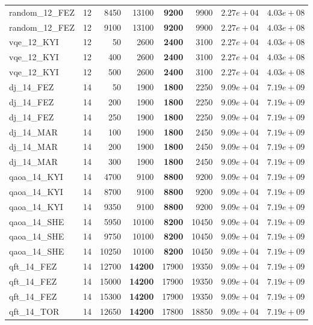 \begin{table}[ht!]
\begin{tabular}{l c r r r r r r}
random\_12\_FEZ & 12 & 8450 & 13100 & \textbf{9200} & 9900 & $2.27e+04$ & $4.03e+08$ \\
random\_12\_FEZ & 12 & 9100 & 13100 & \textbf{9200} & 9900 & $2.27e+04$ & $4.03e+08$ \\
vqe\_12\_KYI & 12 & 50 & 2600 & \textbf{2400} & 3100 & $2.27e+04$ & $4.03e+08$ \\
vqe\_12\_KYI & 12 & 400 & 2600 & \textbf{2400} & 3100 & $2.27e+04$ & $4.03e+08$ \\
vqe\_12\_KYI & 12 & 500 & 2600 & \textbf{2400} & 3100 & $2.27e+04$ & $4.03e+08$ \\
dj\_14\_FEZ & 14 & 50 & 1900 & \textbf{1800} & 2250 & $9.09e+04$ & $7.19e+09$ \\
dj\_14\_FEZ & 14 & 200 & 1900 & \textbf{1800} & 2250 & $9.09e+04$ & $7.19e+09$ \\
dj\_14\_FEZ & 14 & 250 & 1900 & \textbf{1800} & 2250 & $9.09e+04$ & $7.19e+09$ \\
dj\_14\_MAR & 14 & 100 & 1900 & \textbf{1800} & 2450 & $9.09e+04$ & $7.19e+09$ \\
dj\_14\_MAR & 14 & 200 & 1900 & \textbf{1800} & 2450 & $9.09e+04$ & $7.19e+09$ \\
dj\_14\_MAR & 14 & 300 & 1900 & \textbf{1800} & 2450 & $9.09e+04$ & $7.19e+09$ \\
qaoa\_14\_KYI & 14 & 4700 & 9100 & \textbf{8800} & 9200 & $9.09e+04$ & $7.19e+09$ \\
qaoa\_14\_KYI & 14 & 8700 & 9100 & \textbf{8800} & 9200 & $9.09e+04$ & $7.19e+09$ \\
qaoa\_14\_KYI & 14 & 9350 & 9100 & \textbf{8800} & 9200 & $9.09e+04$ & $7.19e+09$ \\
qaoa\_14\_SHE & 14 & 5950 & 10100 & \textbf{8200} & 10450 & $9.09e+04$ & $7.19e+09$ \\
qaoa\_14\_SHE & 14 & 9750 & 10100 & \textbf{8200} & 10450 & $9.09e+04$ & $7.19e+09$ \\
qaoa\_14\_SHE & 14 & 10250 & 10100 & \textbf{8200} & 10450 & $9.09e+04$ & $7.19e+09$ \\
qft\_14\_FEZ & 14 & 12700 & \textbf{14200} & 17900 & 19350 & $9.09e+04$ & $7.19e+09$ \\
qft\_14\_FEZ & 14 & 15000 & \textbf{14200} & 17900 & 19350 & $9.09e+04$ & $7.19e+09$ \\
qft\_14\_FEZ & 14 & 15300 & \textbf{14200} & 17900 & 19350 & $9.09e+04$ & $7.19e+09$ \\
qft\_14\_TOR & 14 & 12650 & \textbf{14200} & 17800 & 18850 & $9.09e+04$ & $7.19e+09$ \\

\end{tabular}
\end{table}

